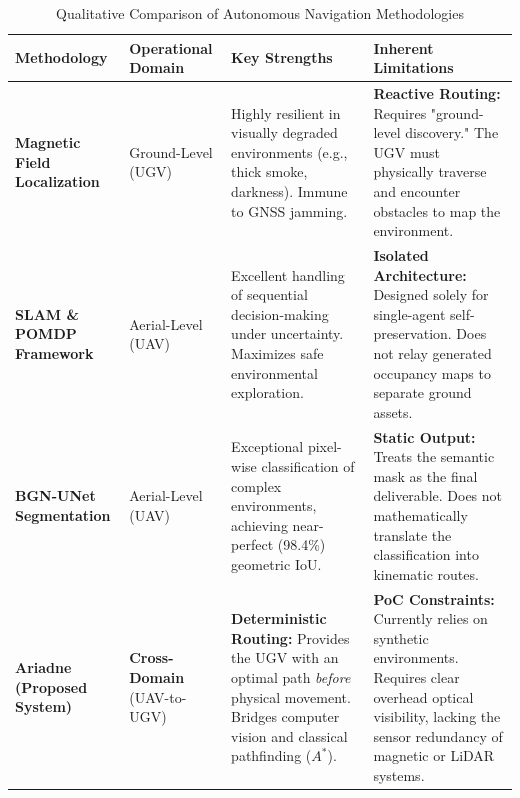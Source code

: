 \documentclass[12pt, a4paper]{article}
\begin{document}
\begin{table}[t]
    \centering
    \renewcommand{\arraystretch}{1.5}
    \begin{tabular}{|p{}|p{}|p{}|p{}|}
        \hline
        \textbf{Methodology} & \textbf{Operational Domain} & \textbf{Key Strengths} & \textbf{Inherent Limitations} \\ \hline
        
        \textbf{Magnetic Field \newline Localization} \cite{11219502} & Ground-Level (UGV) & Highly resilient in visually degraded environments (e.g., thick smoke, darkness). Immune to GNSS jamming. & \textbf{Reactive Routing:} Requires "ground-level discovery." The UGV must physically traverse and encounter obstacles to map the environment. \\ \hline
        
        \textbf{SLAM \& POMDP Framework} \cite{8741612} & Aerial-Level (UAV) & Excellent handling of sequential decision-making under uncertainty. Maximizes safe environmental exploration. & \textbf{Isolated Architecture:} Designed solely for single-agent self-preservation. Does not relay generated occupancy maps to separate ground assets. \\ \hline
        
        \textbf{BGN-UNet \newline Segmentation} \cite{Doghmane_Boukari_2024} & Aerial-Level (UAV) & Exceptional pixel-wise classification of complex environments, achieving near-perfect (98.4\%) geometric IoU. & \textbf{Static Output:} Treats the semantic mask as the final deliverable. Does not mathematically translate the classification into kinematic routes. \\ \hline
        
        \textbf{Ariadne \newline (Proposed \newline System)} & \textbf{Cross-Domain} (UAV-to-UGV) & \textbf{Deterministic Routing:} Provides the UGV with an optimal path \textit{before} physical movement. Bridges computer vision and classical pathfinding ($A^*$). & \textbf{PoC Constraints:} Currently relies on synthetic environments. Requires clear overhead optical visibility, lacking the sensor redundancy of magnetic or LiDAR systems. \\ \hline
    \end{tabular}
    \caption{Qualitative Comparison of Autonomous Navigation Methodologies}
    \label{tab:comparison}
\end{table}
\end{document}
